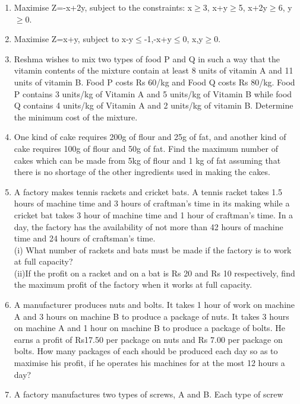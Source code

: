 \begin{enumerate}[label=\arabic*.,ref=\thesubsection.\theenumi]
\item Maximise Z=-x+2y, subject to the constraints:
x$\geq$3, x+y$\geq$5, x+2y$\geq$6, y$\geq$0.\\
\item Maximise Z=x+y, subject to x-y$\leq$-1,-x+y$\leq$0, x,y$\geq$0.\\
\item Reshma wishes to mix two types of food P and Q in such a way that the vitamin
contents of the mixture contain at least 8 units of vitamin A and 11 units of
vitamin B. Food P costs Rs 60/kg and Food Q costs Rs 80/kg. Food P contains
3 units/kg of Vitamin A and 5 units/kg of Vitamin B while food Q contains
4 units/kg of Vitamin A and 2 units/kg of vitamin B. Determine the minimum cost
of the mixture.\\
\item One kind of cake requires 200g of flour and 25g of fat, and another kind of cake
requires 100g of flour and 50g of fat. Find the maximum number of cakes which
can be made from 5kg of flour and 1 kg of fat assuming that there is no shortage
of the other ingredients used in making the cakes.\\
\item A factory makes tennis rackets and cricket bats. A tennis racket takes 1.5 hours
of machine time and 3 hours of craftman’s time in its making while a cricket bat
takes 3 hour of machine time and 1 hour of craftman’s time. In a day, the factory
has the availability of not more than 42 hours of machine time and 24 hours of
craftsman’s time.\\
(i) What number of rackets and bats must be made if the factory is to work
at full capacity?\\
(ii)If the profit on a racket and on a bat is Rs 20 and Rs 10 respectively, find
the maximum profit of the factory when it works at full capacity.\\
\item A manufacturer produces nuts and bolts. It takes 1 hour of work on machine A
and 3 hours on machine B to produce a package of nuts. It takes 3 hours on
machine A and 1 hour on machine B to produce a package of bolts. He earns a
profit of Rs17.50 per package on nuts and Rs 7.00 per package on bolts. How
many packages of each should be produced each day so as to maximise his
profit, if he operates his machines for at the most 12 hours a day?\\
\item A factory manufactures two types of screws, A and B. Each type of screw

\end{enumerate}
